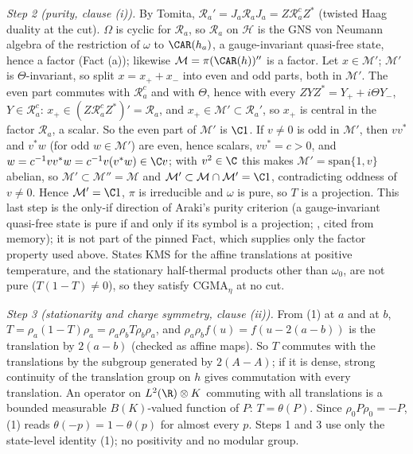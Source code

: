 \emph{Step 2 (purity, clause (i)).} By Tomita, $\mathcal{R}_{a}' = J_{a}\mathcal{R}_{a}J_{a} = Z\mathcal{R}_{a}^{c}Z^{*}$ (twisted Haag duality at the cut). $\Omega$ is cyclic for $\mathcal{R}_{a}$, so $\mathcal{R}_{a}$ on $\mathcal{H}$ is the GNS von Neumann algebra of the restriction of $\omega$ to $\CAR(h_{a})$, a gauge-invariant quasi-free state, hence a factor (Fact (a)); likewise $\mathcal{M} = \pi(\CAR(h))''$ is a factor. Let $x \in \mathcal{M}'$; $\mathcal{M}'$ is $\Theta$-invariant, so split $x = x_{+} + x_{-}$ into even and odd parts, both in $\mathcal{M}'$. The even part commutes with $\mathcal{R}_{a}^{c}$ and with $\Theta$, hence with every $ZYZ^{*} = Y_{+} + i\Theta Y_{-}$, $Y \in \mathcal{R}_{a}^{c}$: $x_{+} \in (Z\mathcal{R}_{a}^{c}Z^{*})' = \mathcal{R}_{a}$, and $x_{+} \in \mathcal{M}' \subset \mathcal{R}_{a}'$, so $x_{+}$ is central in the factor $\mathcal{R}_{a}$, a scalar. So the even part of $\mathcal{M}'$ is $\C 1$. If $v \ne 0$ is odd in $\mathcal{M}'$, then $vv^{*}$ and $v^{*}w$ (for odd $w \in \mathcal{M}'$) are even, hence scalars, $vv^{*} = c > 0$, and $w = c^{-1}vv^{*}w = c^{-1}v(v^{*}w) \in \C v$; with $v^{2} \in \C$ this makes $\mathcal{M}' = \mathrm{span}\{1, v\}$ abelian, so $\mathcal{M}' \subset \mathcal{M}'' = \mathcal{M}$ and $\mathcal{M}' \subset \mathcal{M}\cap\mathcal{M}' = \C 1$, contradicting oddness of $v \ne 0$. Hence $\mathcal{M}' = \C 1$, $\pi$ is irreducible and $\omega$ is pure, so $T$ is a projection. This last step is the only-if direction of Araki's purity criterion (a gauge-invariant quasi-free state is pure if and only if its symbol is a projection; \cite{Araki1970}, cited from memory); it is not part of the pinned Fact, which supplies only the factor property used above. States KMS for the affine translations at positive temperature, and the stationary half-thermal products other than $\omega_{0}$, are not pure ($T(1 - T) \ne 0$), so they satisfy CGMA$_{\eta}$ at no cut.

\emph{Step 3 (stationarity and charge symmetry, clause (ii)).} From (1) at $a$ and at $b$, $T = \rho_{a}(1 - T)\rho_{a} = \rho_{a}\rho_{b}T\rho_{b}\rho_{a}$, and $\rho_{a}\rho_{b}f(u) = f(u - 2(a - b))$ is the translation by $2(a - b)$ (checked as affine maps). So $T$ commutes with the translations by the subgroup generated by $2(A - A)$; if it is dense, strong continuity of the translation group on $h$ gives commutation with every translation. An operator on $L^{2}(\R)\otimes K$ commuting with all translations is a bounded measurable $B(K)$-valued function of $P$: $T = \theta(P)$. Since $\rho_{0}P\rho_{0} = -P$, (1) reads $\theta(-p) = 1 - \theta(p)$ for almost every $p$. Steps 1 and 3 use only the state-level identity (1); no positivity and no modular group.


